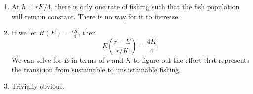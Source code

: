\documentclass{article}
\begin{document}
\begin{enumerate}
\begin{enumerate}
                \item At $h=rK/4$, there is only one rate of fishing such that the fish population will remain constant. There is no way for it to increase.
                \item If we let $H(E) = \frac{rK}{4}$, then 
                \begin{equation}
                    E\left(\frac{r-E}{r/K}\right) = \frac{4K}{4}.
                \end{equation}
                We can solve for $E$ in terms of $r$ and $K$ to figure out the effort that represents the transition from sustainable to unsustainable fishing.
                \item Trivially obvious.
            \end{enumerate}
\end{enumerate}
\end{document}
